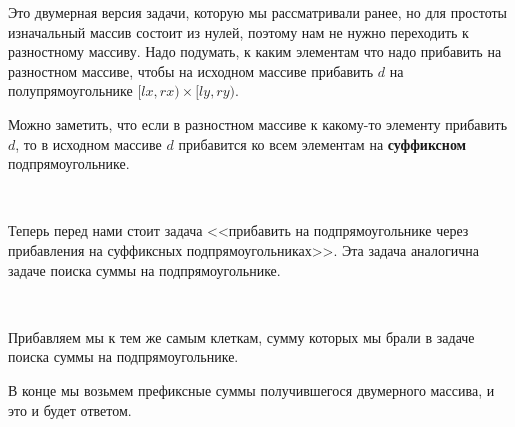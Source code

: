 \begin{solution}
    Это двумерная версия задачи, которую мы рассматривали ранее, но для простоты изначальный массив состоит из нулей, поэтому нам не нужно переходить к разностному массиву. Надо подумать, к каким элементам что надо прибавить на разностном массиве, чтобы на исходном массиве прибавить $d$ на полупрямоугольнике $[lx, rx) \times [ly, ry)$.

Можно заметить, что если в разностном массиве к какому-то элементу прибавить $d$, то в исходном массиве $d$ прибавится ко всем элементам на \textbf{суффиксном} подпрямоугольнике.


\



Теперь перед нами стоит задача <<прибавить на подпрямоугольнике через прибавления на суффиксных подпрямоугольниках>>. Эта задача аналогична задаче поиска суммы на подпрямоугольнике.



\



Прибавляем мы к тем же самым клеткам, сумму которых мы брали в задаче поиска суммы на подпрямоугольнике.


В конце мы возьмем префиксные суммы получившегося двумерного массива, и это и будет ответом.

\end{solution}


